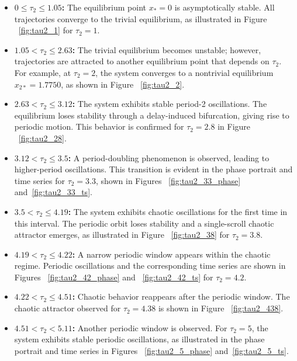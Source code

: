 \documentclass[11pt]{article}
\theoremstyle{remark}
\begin{document}
\begin{itemize}
	\item \textbf{$0 \leq \tau_2 \leq 1.05$:}  
	The equilibrium point $x_* = 0$ is asymptotically stable. All trajectories converge to the trivial equilibrium, as illustrated in Figure ~\ref{fig:tau2_1} for $\tau_2 = 1$.
	
	\item \textbf{$1.05 < \tau_2 \leq 2.63$:}  
	The trivial equilibrium becomes unstable; however, trajectories are attracted to another equilibrium point that depends on $\tau_2$. For example, at $\tau_2 = 2$, the system converges to a nontrivial equilibrium $x_{2*} = 1.7750$, as shown in Figure ~\ref{fig:tau2_2}.
	
	\item \textbf{$2.63 < \tau_2 \leq 3.12$:}  
	The system exhibits stable period-2 oscillations. The equilibrium loses stability through a delay-induced bifurcation, giving rise to periodic motion. This behavior is confirmed for $\tau_2 = 2.8$ in Figure ~\ref{fig:tau2_28}.
	
	\item \textbf{$3.12 < \tau_2 \leq 3.5$:}  
	A period-doubling phenomenon is observed, leading to higher-period oscillations. This transition is evident in the phase portrait and time series for $\tau_2 = 3.3$, shown in Figures ~\ref{fig:tau2_33_phase} and~\ref{fig:tau2_33_ts}.
	
	\item \textbf{$3.5 < \tau_2 \leq 4.19$:}  
	The system exhibits chaotic oscillations for the first time in this interval. The periodic orbit loses stability and a single-scroll chaotic attractor emerges, as illustrated in Figure ~\ref{fig:tau2_38} for $\tau_2 = 3.8$.
	
	\item \textbf{$4.19 < \tau_2 \leq 4.22$:}  
	A narrow periodic window appears within the chaotic regime. Periodic oscillations and the corresponding time series are shown in Figures ~\ref{fig:tau2_42_phase} and ~\ref{fig:tau2_42_ts} for $\tau_2 = 4.2$.
	
	\item \textbf{$4.22 < \tau_2 \leq 4.51$:}  
	Chaotic behavior reappears after the periodic window. The chaotic attractor observed for $\tau_2 = 4.38$ is shown in Figure ~\ref{fig:tau2_438}.
	
	\item \textbf{$4.51 < \tau_2 < 5.11$:}  
	Another periodic window is observed. For $\tau_2 = 5$, the system exhibits stable periodic oscillations, as illustrated in the phase portrait and time series in Figures ~\ref{fig:tau2_5_phase} and~\ref{fig:tau2_5_ts}.
	

\end{itemize}
\end{document}
